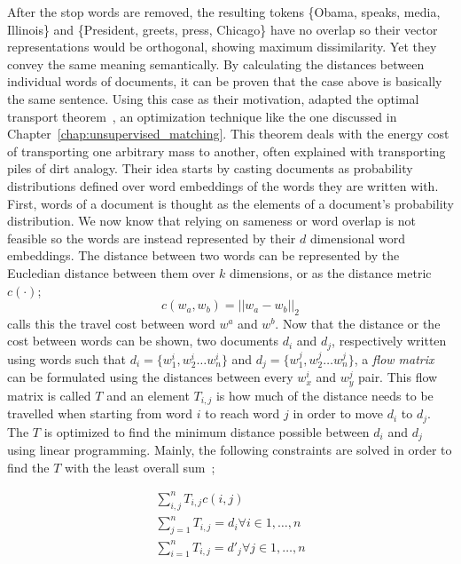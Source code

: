 After the stop words are removed, the resulting tokens \{Obama, speaks, media, Illinois\} and \{President, greets, press, Chicago\} have no overlap so their vector representations would be orthogonal, showing maximum dissimilarity.
Yet they convey the same meaning semantically.
By calculating the distances between individual words of documents, it can be proven that the case above is basically the same sentence.
Using this case as their motivation, \citeauthor{kusner_word_2015} adapted the optimal transport theorem~\cite{kantorovitch_translocation_1958}, an optimization technique like the one discussed in Chapter~\ref{chap:unsupervised_matching}.
This theorem deals with the energy cost of transporting one arbitrary mass to another, often explained with transporting piles of dirt analogy.
Their idea starts by casting documents as probability distributions defined over word embeddings of the words they are written with.
First, words of a document is thought as the elements of a document's probability distribution.
We now know that relying on sameness or word overlap is not feasible so the words are instead represented by their $d$ dimensional word embeddings.
The distance between two words can be represented by the Eucledian distance between them over $k$ dimensions, or as the distance metric $c(\cdot)$;
\begin{displaymath}
    c(w_a, w_b) = || w_a - w_b ||_2
\end{displaymath}
\textcite{kusner_word_2015} calls this the travel cost between word $w^a$ and $w^b$.
Now that the distance or the cost between words can be shown, two documents $d_i$ and $d_j$, respectively written using words such that $d_i = \{w^{i}_1, w^{i}_2 \dots w^{i}_n\}$ and $d_j = \{w^{j}_1, w^{j}_2 \dots w^{j}_n\}$, a \emph{flow matrix} can be formulated using the distances between every $w^{i}_x$ and $w^{j}_y$ pair.
This flow matrix is called $T$ and an element $T_{i,j}$ is how much of the distance needs to be travelled when starting from word $i$ to reach word $j$ in order to move $d_i$ to $d_j$.
The $T$ is optimized to find the minimum distance possible between $d_i$ and $d_j$ using linear programming.
Mainly, the following constraints are solved in order to find the $T$ with the least overall sum~\cite{kusner_word_2015};

\begin{gather}
    \sum_{i,j}^{n}T_{i,j}c(i,j) \\
    \sum_{j=1}^{n}T_{i,j} = d_i \forall i \in {1, \dots, n} \\
    \sum_{i=1}^{n}T_{i,j} = d'_j \forall j \in {1, \dots, n}
\end{gather}

